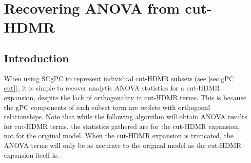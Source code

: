 
\chapter{Recovering ANOVA from cut-HDMR} %

\label{apx:cut anova} %


\section{Introduction}\label{sec:cut to anova}
When using SCgPC to represent individual cut-HDMR subsets (see \ref{sec:gPC cut}), it is simple to recover 
analytic ANOVA statistics for a
cut-HDMR expansion, despite the lack of orthogonality in cut-HDMR terms.  This is because the gPC components
of each subset term are replete with orthogonal relationships.  Note that while the following algorithm will
obtain ANOVA results for cut-HDMR terms, the statistics gathered are for the cut-HDMR expansion, not for the
original model.  When the cut-HDMR expansion is truncated, the ANOVA terms will only be as accurate
to the original model as the cut-HDMR expansion itself is.

